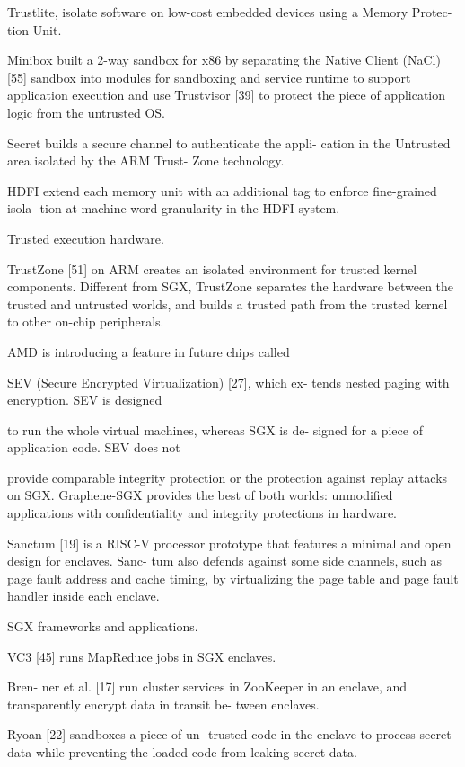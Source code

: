 Trustlite, isolate software
on low-cost embedded devices using a Memory Protec-
tion Unit.

Minibox built a 2-way sandbox for x86
by separating the Native Client (NaCl) [55] sandbox into
modules for sandboxing and service runtime to support
application execution and use Trustvisor [39] to protect
the piece of application logic from the untrusted OS.

Secret builds a secure channel to authenticate the appli-
cation in the Untrusted area isolated by the ARM Trust-
Zone technology.

HDFI extend each memory
unit with an additional tag to enforce fine-grained isola-
tion at machine word granularity in the HDFI system.


Trusted execution hardware.

TrustZone [51] on ARM creates an isolated
environment for trusted kernel components. Different
from SGX, TrustZone separates the hardware between
the trusted and untrusted worlds, and builds a trusted path
from the trusted kernel to other on-chip peripherals.

AMD is introducing a feature in future chips called

SEV (Secure Encrypted Virtualization) [27], which ex-
tends nested paging with encryption. SEV is designed

to run the whole virtual machines, whereas SGX is de-
signed for a piece of application code. SEV does not

provide comparable integrity protection or the protection
against replay attacks on SGX. Graphene-SGX provides
the best of both worlds: unmodified applications with
confidentiality and integrity protections in hardware.

Sanctum [19] is a RISC-V processor prototype that
features a minimal and open design for enclaves. Sanc-
tum also defends against some side channels, such as
page fault address and cache timing, by virtualizing the
page table and page fault handler inside each enclave.


SGX frameworks and applications.

VC3 [45]
runs MapReduce jobs in SGX enclaves.

Bren-
ner et al. [17] run cluster services in ZooKeeper in an
enclave, and transparently encrypt data in transit be-
tween enclaves.

Ryoan [22] sandboxes a piece of un-
trusted code in the enclave to process secret data while
preventing the loaded code from leaking secret data.

